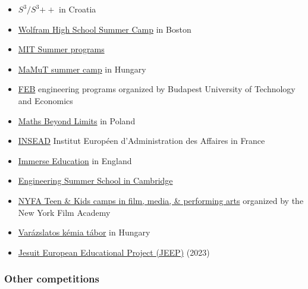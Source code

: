 \documentclass{article}
\begin{document}
\begin{itemize}
    \item \href{http://drustvo-evo.hr/s3/}{$S^3/S^3{\mathrm{++}}$} in Croatia
    \item \href{https://education.wolfram.com/summer-camp/}{Wolfram High School Summer Camp} in Boston
    \item \href{https://mitadmissions.org/apply/prepare/summer/}{MIT Summer programs}
    \item \href{https://en.agondolkodasorome.hu/summercamps/#}{MaMuT summer camp} in Hungary
    \item \href{https://feb.ch.bme.hu/}{FEB} engineering programs organized by Budapest University of Technology and Economics
    \item \href{https://mathsbeyondlimits.eu/}{Maths Beyond Limits} in Poland
    \item \href{https://www.insead.edu/}{INSEAD} Institut Européen d'Administration des Affaires in France
    \item \href{https://www.immerse.education/}{Immerse Education} in England
    \item \href{https://www.immerse.education/engineering-summer-school/cambridge/}{Engineering Summer School in Cambridge}
    \item \href{https://www.nyfa.edu/summer-camps/}{NYFA Teen \& Kids camps in film, media, \& performing arts} organized by the New York Film Academy
    \item \href{https://www.varazslatos-kemia-tabor.mke.org.hu/}{Varázslatos kémia tábor} in Hungary
    \item \href{https://www.fje.edu/en/jesuites-sarria/news/jesuit-european-educational-project-jeep-2023}{Jesuit European Educational Project (JEEP)} (2023)
\end{itemize}

\subsubsection{Other competitions}
\end{document}
